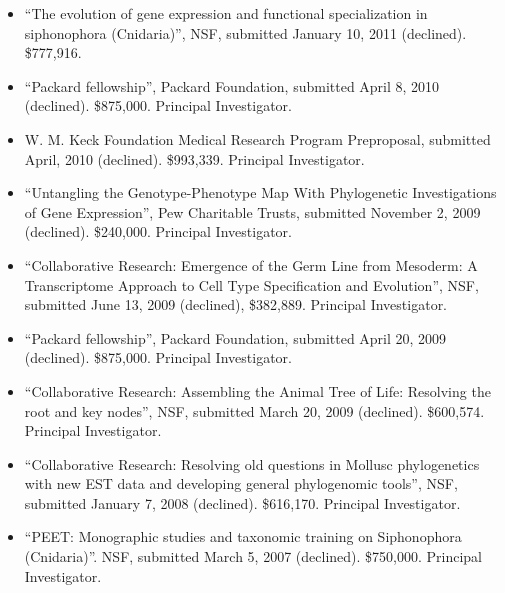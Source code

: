 \begin{itemize}
\item ``The evolution of gene expression and functional specialization in siphonophora (Cnidaria)'', NSF, submitted January 10, 2011 (declined). \$777,916.
\item ``Packard fellowship'', Packard Foundation, submitted April 8, 2010 (declined). \$875,000. Principal Investigator.
\item W. M. Keck Foundation Medical Research Program Preproposal, submitted April, 2010 (declined). \$993,339. Principal Investigator.
\item ``Untangling the Genotype-Phenotype Map With Phylogenetic Investigations of Gene Expression'', Pew Charitable Trusts, submitted November 2, 2009 (declined). \$240,000. Principal Investigator.
\item ``Collaborative Research: Emergence of the Germ Line from Mesoderm: A Transcriptome Approach to Cell Type Specification and Evolution'', NSF, submitted June 13, 2009 (declined), \$382,889. Principal Investigator.
\item ``Packard fellowship'', Packard Foundation, submitted April 20, 2009 (declined). \$875,000. Principal Investigator.
\item ``Collaborative Research: Assembling the Animal Tree of Life: Resolving the root and key nodes'', NSF, submitted March 20, 2009 (declined). \$600,574. Principal Investigator.
\item ``Collaborative Research: Resolving old questions in Mollusc phylogenetics with new EST data and developing general phylogenomic tools'', NSF, submitted January 7, 2008 (declined). \$616,170. Principal Investigator.
\item ``PEET: Monographic studies and taxonomic training on Siphonophora (Cnidaria)''. NSF, submitted March 5, 2007 (declined). \$750,000. Principal Investigator.

\end{itemize}

\fi